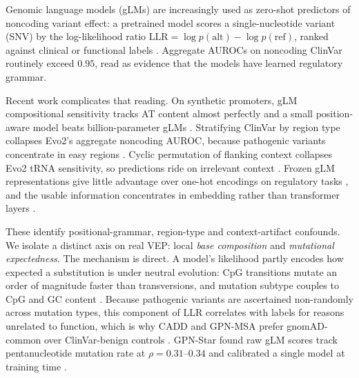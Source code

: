 \documentclass[pmlr]{jmlr}
\begin{document}
Genomic language models (gLMs) are increasingly used as zero-shot predictors of noncoding
variant effect: a pretrained model scores a single-nucleotide variant (SNV) by the
log-likelihood ratio $\mathrm{LLR}=\log p(\text{alt})-\log p(\text{ref})$, ranked against
clinical or functional labels \citep{benegas2025gpnmsa,brixi2026evo2}. Aggregate AUROCs on
noncoding ClinVar routinely exceed $0.95$, read as evidence that the models have learned
regulatory grammar.

Recent work complicates that reading. On synthetic promoters, gLM compositional sensitivity
tracks AT content almost perfectly and a small position-aware model beats billion-parameter
gLMs \citep{mit2026}. Stratifying ClinVar by region type collapses Evo2's aggregate noncoding
AUROC, because pathogenic variants concentrate in easy regions \citep{lu2025heterogeneity}.
Cyclic permutation of flanking context collapses Evo2 tRNA sensitivity, so predictions ride on
irrelevant context \citep{mathur2026blindspots}. Frozen gLM representations give little
advantage over one-hot encodings on regulatory tasks \citep{tang2025koo}, and the usable
information concentrates in embedding rather than transformer layers \citep{entropy2026}.

These identify positional-grammar, region-type and context-artifact confounds. We isolate a
distinct axis on real VEP: local \emph{base composition} and \emph{mutational expectedness}.
The mechanism is direct. A model's likelihood partly encodes how expected a substitution is
under neutral evolution: CpG transitions mutate an order of magnitude faster than
transversions, and mutation subtype couples to CpG and GC content \citep{carlson2018mutrate}.
Because pathogenic variants are ascertained non-randomly across mutation types, this component
of LLR correlates with labels for reasons unrelated to function, which is why CADD and GPN-MSA
prefer gnomAD-common over ClinVar-benign controls \citep{rentzsch2019cadd,benegas2025gpnmsa}.
GPN-Star found raw gLM scores track pentanucleotide mutation rate at $\rho=0.31$--$0.34$ and
calibrated a single model at training time \citep{gpnstar2025}.
\end{document}
